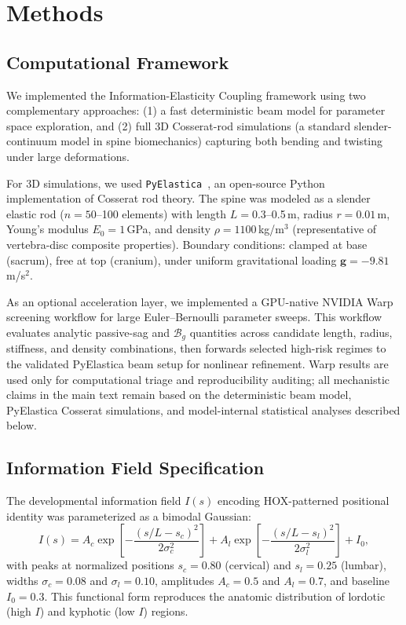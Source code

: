 \section{Methods}

\subsection{Computational Framework}

We implemented the Information-Elasticity Coupling framework using two complementary approaches: (1) a fast deterministic beam model for parameter space exploration, and (2) full 3D Cosserat-rod simulations (a standard slender-continuum model in spine biomechanics) capturing both bending and twisting under large deformations.

For 3D simulations, we used \texttt{PyElastica}~\cite{pyelastica_zenodo,gazzola2018forward}, an open-source Python implementation of Cosserat rod theory. The spine was modeled as a slender elastic rod ($n=50$--100 elements) with length $L=0.3$--0.5\,m, radius $r=0.01$\,m, Young's modulus $E_0=1$\,GPa, and density $\rho=1100$\,kg/m$^3$ (representative of vertebra-disc composite properties). Boundary conditions: clamped at base (sacrum), free at top (cranium), under uniform gravitational loading $\mathbf{g} = -9.81$\,m/s$^2$.

As an optional acceleration layer, we implemented a GPU-native NVIDIA Warp screening workflow for large Euler--Bernoulli parameter sweeps. This workflow evaluates analytic passive-sag and $\mathcal{B}_g$ quantities across candidate length, radius, stiffness, and density combinations, then forwards selected high-risk regimes to the validated PyElastica beam setup for nonlinear refinement. Warp results are used only for computational triage and reproducibility auditing; all mechanistic claims in the main text remain based on the deterministic beam model, PyElastica Cosserat simulations, and model-internal statistical analyses described below.

\subsection{Information Field Specification}

The developmental information field $I(s)$ encoding HOX-patterned positional identity was parameterized as a bimodal Gaussian:
\begin{equation}
I(s) = A_c \exp\left[-\frac{(s/L - s_c)^2}{2\sigma_c^2}\right] + A_l \exp\left[-\frac{(s/L - s_l)^2}{2\sigma_l^2}\right] + I_0,
\label{eq:info_field}
\end{equation}
with peaks at normalized positions $s_c = 0.80$ (cervical) and $s_l = 0.25$ (lumbar), widths $\sigma_c = 0.08$ and $\sigma_l = 0.10$, amplitudes $A_c = 0.5$ and $A_l = 0.7$, and baseline $I_0 = 0.3$. This functional form reproduces the anatomic distribution of lordotic (high $I$) and kyphotic (low $I$) regions.

